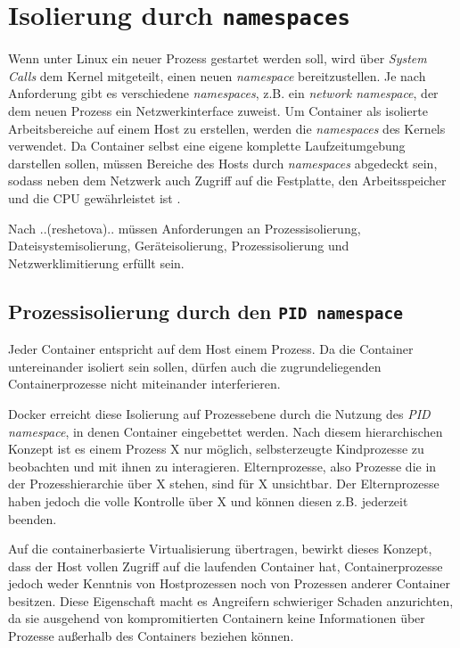 \documentclass[../main.tex]{subfiles}
\begin{document}
	\section{Isolierung durch \texttt{namespaces}}
  \label{secIsolierung}
		Wenn unter Linux ein neuer Prozess gestartet werden soll, wird über \emph{System Calls} dem Kernel mitgeteilt, einen neuen \emph{namespace} bereitzustellen. Je nach Anforderung gibt es verschiedene \emph{namespaces}, z.B. ein \emph{network namespace}, der dem neuen Prozess ein Netzwerkinterface zuweist. Um Container als isolierte Arbeitsbereiche auf einem Host zu erstellen, werden die \emph{namespaces} des Kernels verwendet. Da Container selbst eine eigene komplette Laufzeitumgebung darstellen sollen, müssen Bereiche des Hosts durch \emph{namespaces} abgedeckt sein, sodass neben dem Netzwerk auch Zugriff auf die Festplatte, den Arbeitsspeicher und die \acrshort{CPU} gewährleistet ist \cite[S.3]{dockerIntroIEEE}.

		Nach ..(reshetova).. müssen Anforderungen an Prozessisolierung, Dateisystemisolierung, Geräteisolierung, Prozessisolierung und Netzwerklimitierung erfüllt sein.
		\subsection{Prozessisolierung durch den \texttt{\acrshort{PID} namespace}}
		\label{secIsoProcesses}

			Jeder Container entspricht auf dem Host einem Prozess. Da die Container untereinander isoliert sein sollen, dürfen auch die zugrundeliegenden Containerprozesse nicht miteinander interferieren.

			Docker erreicht diese Isolierung auf Prozessebene durch die Nutzung des \emph{\acrshort{PID} namespace}, in denen Container eingebettet werden. Nach diesem hierarchischen Konzept ist es einem Prozess X nur möglich, selbsterzeugte Kindprozesse zu beobachten und mit ihnen zu interagieren. Elternprozesse, also Prozesse die in der Prozesshierarchie über X stehen, sind für X unsichtbar. Der Elternprozesse haben jedoch die volle Kontrolle über X und können diesen z.B. jederzeit beenden.

			Auf die containerbasierte Virtualisierung übertragen, bewirkt dieses Konzept, dass der Host vollen Zugriff auf die laufenden Container hat, Containerprozesse jedoch weder Kenntnis von Hostprozessen noch von Prozessen anderer Container besitzen. Diese Eigenschaft macht es Angreifern schwieriger Schaden anzurichten, da sie ausgehend von kompromitierten Containern keine Informationen über Prozesse außerhalb des Containers beziehen können.
\end{document}
